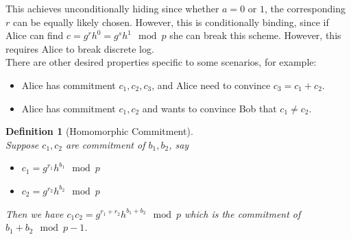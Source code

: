 \documentclass[12pt]{article}
\newtheorem{definition}{Definition}[section]
\theoremstyle{definition}
\begin{document}
This achieves unconditionally hiding since whether $a=0$ or $1$, the corresponding $r$ can be equally likely chosen. However, this is conditionally binding, since if Alice can find
$
c=g^rh^0=g^sh^1\mod p
$
she can break this scheme. However, this requires Alice to break discrete log.\\
There are other desired properties specific to some scenarios, for example:
\begin{itemize}
  \item Alice has commitment $c_1,c_2,c_3$, and Alice need to convince $c_3=c_1+c_2$.
  \item Alice has commitment $c_1,c_2$ and wants to convince Bob that $c_1\neq c_2$.
\end{itemize}
\begin{definition}[Homomorphic Commitment]
\hfill\\\normalfont Suppose $c_1,c_2$ are commitment of $b_1,b_2$, say
\begin{itemize}
  \item $c_1=g^{r_1}h^{b_1}\mod p$
  \item $c_2=g^{r_2}h^{b_2}\mod p$
\end{itemize}
Then we have
$
c_1c_2=g^{r_1+r_2}h^{b_1+b_2}\mod p
$
which is the commitment of $b_1+b_2\mod p-1$.
\end{definition}
\end{document}
